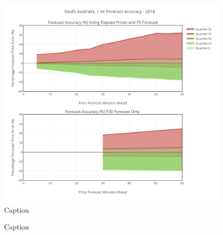 \begin{figure}
    \centering
    \includegraphics{Pictures/Chapter4/p30_p5_accuracy.png}
    \caption{Caption}
    \label{fig:my_label}
\end{figure}
\begin{figure}[H]
    \centering
    \caption{Caption}
    \label{fig:my_label}
\end{figure}


